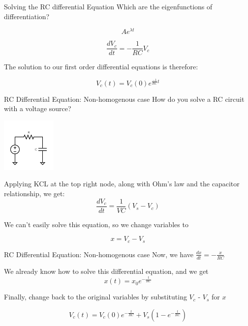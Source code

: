 \begin{frame}{Solving the RC differential Equation}
    Which are the eigenfunctions of differentiation?
    \pause
    
    \[Ae^{\lambda{t}}\]

    \pause
    
    \[\frac{dV_c}{dt} = -\frac{1}{RC}V_c\]
    
    The solution to our first order differential equations is therefore:

    \[V_c(t) = V_c(0)e^{\frac{-1}{RC}t} \]
\end{frame}

\begin{frame}{RC Differential Equation: Non-homogenous case}
	How do you solve a RC circuit with a voltage source?
    
    \begin{center}
    	\includegraphics[width=0.2\textwidth]{./images/rc-circuits-3.png}
    \end{center}
    
    Applying KCL at the top right node, along with Ohm’s law and the capacitor relationship, we get:
    \[\frac{dV_c}{dt} = \frac{1}{VC}(V_s - V_c)\]
    
    We can't easily solve this equation, so we change variables to
    
    \[x = V_c - V_s\]
\end{frame}

\begin{frame}{RC Differential Equation: Non-homogenous case}
	Now, we have $\frac{dx}{dt} = -\frac{x}{RC}$
    
    We already know how to solve this differential equation, and we get                              
    \[
        x(t) = x_0e^{-\frac{t}{RC}}
    \]
    
    Finally, change back to the original variables by substituting $V_c$ - $V_s$ for $x$
    
    \[V_c(t) = V_c(0)e^{-\frac{t}{RC}} + V_s(1 - e^{-\frac{t}{RC}})\]
\end{frame}
